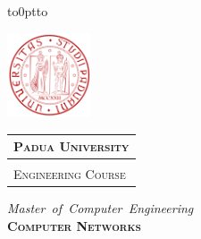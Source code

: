 \documentclass[a4paper, 8pt, twoside, openright]{book}
\begin{document}
\frontmatter

\begin{titlepage} %
\begin{center}
\vbox to0pt{\vbox to\vss}

\begin{center}
\begin{minipage}{.20\textwidth}
  \includegraphics[height=2.5cm]{./Images/Icon4}
\end{minipage}\begin{minipage}{.45\textwidth}
  \begin{table}[H]
  \begin{tabular}{l}
  \scshape{\Large{\bfseries{Padua University}}} \\
  \hline \\
  \scshape{\Large{Engineering Course}} \\
  \end{tabular}
  \end{table}
\end{minipage}
\end{center}


\vspace{1cm}
\emph{\Large{Master~of~Computer~Engineering}} \\
\vspace{0.9cm}
\scshape{\Large{\bfseries{Computer Networks}}} \\
\vspace{0.2cm} \linespread{1} \scshape{\large{\bfseries{}}}
\end{center}


\end{titlepage}
\end{document}
